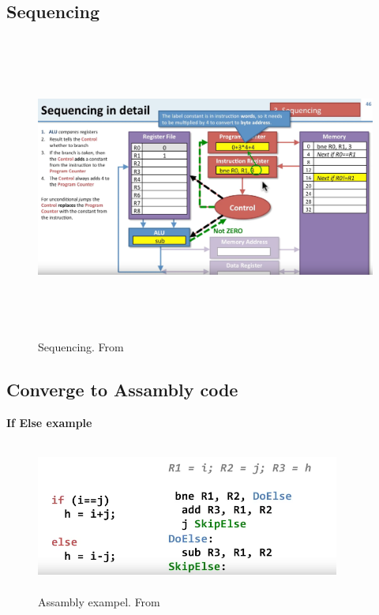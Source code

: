 \subsection{Sequencing}
\begin{figure}[h]
    \vspace{10mm}
    \centering
    \includegraphics[width=16cm, height=10cm]{image/sequencing.png} 
    \caption{Sequencing. From \cite{isa_sequencing}}
    \label{sequencing}
\end{figure}
\newpage

\subsection{Converge to Assambly code}
\noindent\textbf{If Else example} \newline
\begin{figure}[h]
    \vspace{10mm}
    \centering
    \includegraphics[width=10cm, height=5cm]{image/assambly-exampel.png} 
    \caption{Assambly exampel. From \cite{}}
    \label{Assambly-exampel}
\end{figure}

